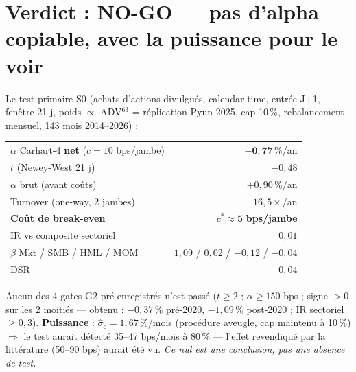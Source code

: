 \documentclass[10pt,a4paper,twocolumn]{article}
\begin{document}

\section{Verdict : NO-GO --- pas d'alpha copiable, avec la puissance pour le voir}
Le test primaire S0 (achats d'actions divulgués, calendar-time, entrée J+1, fenêtre 21 j,
poids $\propto$ ADV$^{63}$ = réplication Pyun 2025, cap 10\,\%, rebalancement mensuel, 143 mois 2014--2026) :
\begin{center}\small
\begin{tabularx}{\linewidth}{@{}Xr@{}}
\toprule
$\alpha$ Carhart-4 \textbf{net} ($c=10$ bps/jambe) & $\mathbf{-0{,}77\,\%}$/an \\
$t$ (Newey-West 21 j) & $-0{,}48$ \\
$\alpha$ brut (avant coûts) & $+0{,}90\,\%$/an \\
Turnover (one-way, 2 jambes) & $16{,}5\times$/an \\
\textbf{Coût de break-even} & $c^{*}\approx\mathbf{5}$ \textbf{bps/jambe} \\
IR vs composite sectoriel & $0{,}01$ \\
$\beta$ Mkt / SMB / HML / MOM & \small$1{,}09$ / $0{,}02$ / $-0{,}12$ / $-0{,}04$ \\
DSR & $0{,}04$ \\
\bottomrule
\end{tabularx}
\end{center}
Aucun des 4 gates G2 pré-enregistrés n'est passé ($t\geq2$ ; $\alpha\geq150$ bps ; signe $>0$ sur les
2 moitiés --- obtenu : $-0{,}37\,\%$ pré-2020, $-1{,}09\,\%$ post-2020 ; IR sectoriel $\geq0{,}3$).
\textbf{Puissance} : $\hat\sigma_\varepsilon=1{,}67\,\%$/mois (procédure aveugle, cap maintenu à 10\,\%)
$\Rightarrow$ le test aurait détecté 35--47 bps/mois à 80\,\% --- l'effet revendiqué par la littérature
(50--90 bps) aurait été vu. \emph{Ce nul est une conclusion, pas une absence de test.}
\end{document}
